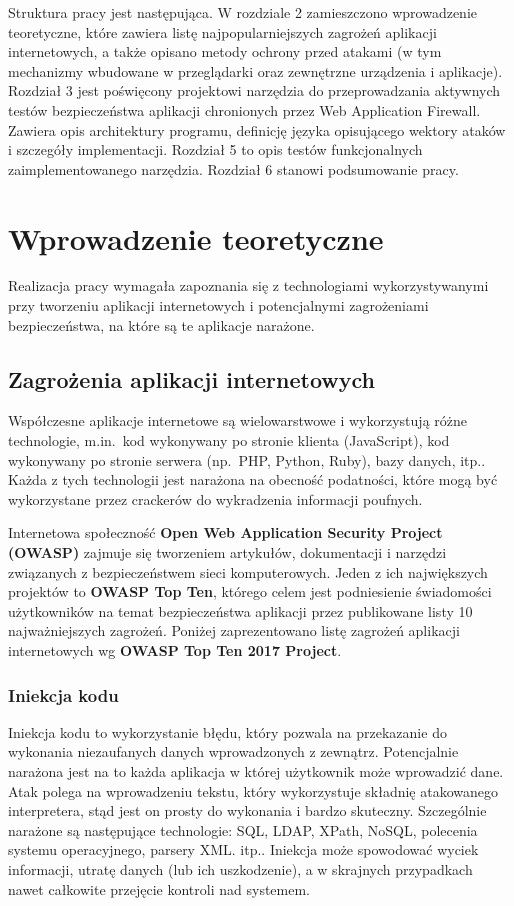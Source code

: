 \documentclass[11pt,a4paper,polish,thesis,oneside]{dcsbook}
\begin{document}
Struktura pracy jest następująca. W rozdziale 2 zamieszczono wprowadzenie teoretyczne, które zawiera listę najpopularniejszych zagrożeń aplikacji internetowych, a także opisano metody ochrony przed atakami (w tym mechanizmy wbudowane w przeglądarki oraz zewnętrzne urządzenia i aplikacje). Rozdział 3 jest poświęcony projektowi narzędzia do przeprowadzania aktywnych testów bezpieczeństwa aplikacji chronionych przez Web Application Firewall. Zawiera opis architektury programu, definicję języka opisującego wektory ataków i szczegóły implementacji. Rozdział 5 to opis testów funkcjonalnych zaimplementowanego narzędzia. Rozdział 6 stanowi podsumowanie pracy.


\chapter{Wprowadzenie teoretyczne}
Realizacja pracy wymagała zapoznania się z technologiami wykorzystywanymi przy tworzeniu aplikacji internetowych i potencjalnymi zagrożeniami bezpieczeństwa, na które są te aplikacje narażone.
\section{Zagrożenia aplikacji internetowych}
Współczesne aplikacje internetowe są wielowarstwowe i wykorzystują różne technologie, m.in.~kod wykonywany po stronie klienta (JavaScript), kod wykonywany po stronie serwera (np.~PHP, Python, Ruby), bazy danych, itp.. Każda z tych technologii jest narażona na obecność podatności, które mogą być wykorzystane przez crackerów do wykradzenia informacji poufnych.

Internetowa społeczność \textbf{Open Web Application Security Project (OWASP)}\cite{owasp} zajmuje się tworzeniem artykułów, dokumentacji i narzędzi związanych z bezpieczeństwem sieci komputerowych. Jeden z ich największych projektów to \textbf{OWASP Top Ten}, którego celem jest podniesienie świadomości użytkowników na temat bezpieczeństwa aplikacji przez publikowane listy 10 najważniejszych zagrożeń. Poniżej zaprezentowano listę zagrożeń aplikacji internetowych wg \textbf{OWASP Top Ten 2017 Project}.

\subsection{Iniekcja kodu}
Iniekcja kodu to wykorzystanie błędu, który pozwala na przekazanie do wykonania niezaufanych danych wprowadzonych z zewnątrz. Potencjalnie narażona jest na to każda aplikacja w której użytkownik może wprowadzić dane. Atak polega na wprowadzeniu tekstu, który wykorzystuje składnię atakowanego interpretera, stąd jest on prosty do wykonania i bardzo skuteczny. Szczególnie narażone są następujące technologie: SQL, LDAP, XPath, NoSQL, polecenia systemu operacyjnego, parsery XML. itp.. Iniekcja może spowodować wyciek informacji, utratę danych (lub ich uszkodzenie), a w skrajnych przypadkach nawet całkowite przejęcie kontroli nad systemem.
\end{document}
